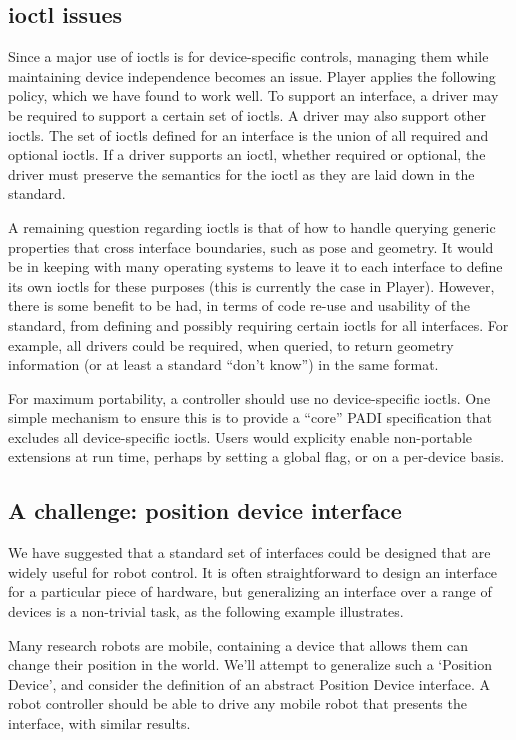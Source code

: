 \documentclass[letterpaper, 10 pt, conference]{iros03}
\begin{document}
\subsection{ioctl issues}
\label{sect:ioctl}
Since a major use of ioctls is for device-specific controls, managing
them while maintaining device independence becomes an issue.  Player
applies the following policy, which we have found to work well.  To
support an interface, a driver may be required to support a certain
set of ioctls.  A driver may also support other ioctls.  The set of
ioctls defined for an interface is the union of all required and
optional ioctls.  If a driver supports an ioctl, whether required or
optional, the driver must preserve the semantics for the ioctl as they
are laid down in the standard.

A remaining question regarding ioctls is that of how to handle querying
generic properties that cross interface boundaries, such as pose and
geometry.  It would be in keeping with many operating systems to leave
it to each interface to define its own ioctls for these purposes (this is
currently the case in Player).  However, there is some benefit to be had,
in terms of code re-use and usability of the standard, from defining and
possibly requiring certain ioctls for all interfaces.  For example, all
drivers could be required, when queried, to return geometry information
(or at least a standard ``don't know'') in the same format.

For maximum portability, a controller should use no device-specific
ioctls. One simple mechanism to ensure this is to provide a ``core''
PADI specification that excludes all device-specific ioctls. Users
would explicity enable non-portable extensions at run time, perhaps by
setting a global flag, or on a per-device basis.

\subsection{A challenge: position device interface}
\label{sect:position-interface}

We have suggested that a standard set of interfaces could be designed that are
widely useful for robot control. It is often straightforward to design
an interface for a particular piece of hardware, but generalizing an
interface over a range of devices is a non-trivial task, as the
following example illustrates.

Many research robots are mobile, containing a device that allows them
can change their position in the world. We'll attempt to generalize
such a `Position Device', and consider the definition of an abstract
Position Device interface. A robot controller should be able to drive
any mobile robot that presents the interface, with similar results.
\end{document}
